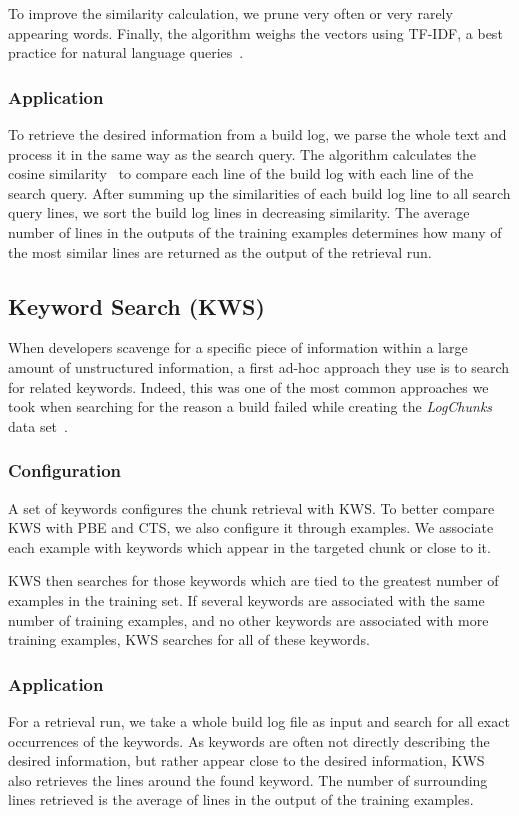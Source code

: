 To improve the similarity calculation, we prune very often or
very rarely appearing words.
Finally, the
algorithm weighs the vectors using TF-IDF, a best practice for natural
language queries~\cite{lee1997document}.

\subsubsection{Application}
To retrieve the desired information from a build log, we parse the
whole text and process it in the same way as the search query.
The algorithm calculates the cosine
similarity~\cite{korenius2007principal} to compare each line of the
build log with each line of the search query.
After summing up the
similarities of each build log line to all search query lines, we sort
the build log lines in decreasing similarity.
The average number of
lines in the outputs of the training examples determines how many of
the most similar lines are returned as the output of the retrieval
run.

\subsection{Keyword Search (KWS)}
When developers scavenge for a specific piece of information within a
large amount of unstructured information, a first ad-hoc approach they
use is to search for related keywords.
Indeed, this was one of the
most common approaches we took when searching for the reason a build
failed while creating the \emph{LogChunks} data
set~\cite{brandt2020logchunks}.

\subsubsection{Configuration}
A set of keywords configures the chunk retrieval with KWS\@.
To better
compare KWS with PBE and CTS, we also configure it through examples.
We associate each example with keywords which appear in the targeted
chunk or close to it.

KWS then searches for those keywords which are tied to the greatest
number of examples in the training set.
If several keywords are associated with the same number of training
examples, and no other keywords are associated with more training
examples, KWS searches for all of these keywords.

\subsubsection{Application}
For a retrieval run, we take a whole build log file as input and
search for all exact occurrences of the keywords.
As keywords are
often not directly describing the desired information, but rather
appear close to the desired information, KWS also retrieves the lines
around the found keyword.
The number of surrounding lines retrieved is
the average of lines in the output of the training examples.


